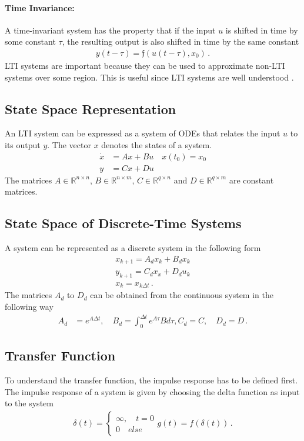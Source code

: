 \paragraph{Time Invariance:}
A time-invariant system has the property that if the input \(u\) is shifted in time by some constant \(\tau\), the resulting output is also shifted in time by the same constant
\begin{gather}
y(t - \tau) = \mathfrak{f}(u(t-\tau),  x_0) \,.
\end{gather}
LTI systems are important because they can be used to approximate non-LTI systems over some region.
This is useful since LTI systems are well understood \cite{DouglasB}.
\subsection{State Space Representation}
An LTI system can be expressed as a system of ODEs that relates the input \(u\) to its output \(y\).
The vector \(x\) denotes the states of a system.
\begin{align}
\dot{x} &= Ax + Bu \quad x(t_0) = x_0\\
y &= Cx + Du
\end{align}
The matrices \(A \in \mathbb{R}^{n \times n}\),
\(B \in \mathbb{R}^{n \times m}\),
\(C \in \mathbb{R}^{q \times n}\) and
\(D \in \mathbb{R}^{q \times m}\) are constant matrices.
\cite{BennerGrivet}
\subsection{State Space of Discrete-Time Systems}
A system can be represented as a discrete system in the following form
\begin{gather}
x_{k+1} = A_dx_k + B_dx_k \label{disc-a} \\
y_{k+1} = C_dx_x + D_du_k \label{disc-b}\\
x_{k} = x_{k\Delta t} \,.
\end{gather}
The matrices \(A_d\) to \(D_d\) can be obtained from the continuous system in the following way \cite{brunton_kutz_2019g}
\begin{align}
A_d &= e^{A\Delta t}, \quad B_d = \int_0^{\Delta t} e^{A\tau}B d\tau, 
C_d = C, \quad D_d = D \,.
\end{align}
\subsection{Transfer Function}
To understand the transfer function, the impulse response has to be defined first.
The impulse response of a system is given by choosing the delta function as input to the system
\begin{gather}
\delta(t) = \begin{cases}
\infty, \quad t = 0 \\
0 \quad else
\end{cases}
g(t) = f(\delta(t)) \,.
\end{gather}

